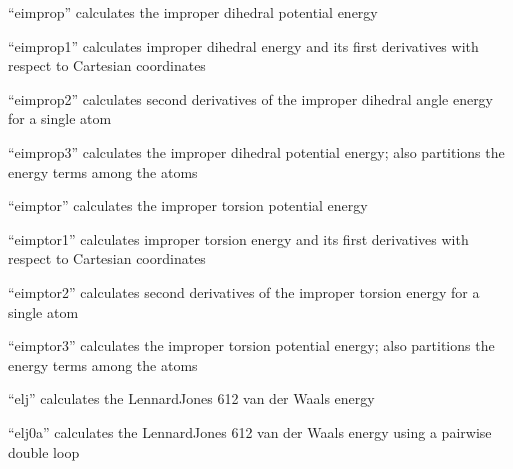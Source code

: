 \documentclass[letterpaper,11pt,english]{sphinxmanual}
\begin{document}






“eimprop” calculates the improper dihedral potential energy


“eimprop1” calculates improper dihedral energy and its first derivatives with respect to Cartesian coordinates


“eimprop2” calculates second derivatives of the improper dihedral angle energy for a single atom


“eimprop3” calculates the improper dihedral potential energy; also partitions the energy terms among the atoms


“eimptor” calculates the improper torsion potential energy


“eimptor1” calculates improper torsion energy and its first derivatives with respect to Cartesian coordinates


“eimptor2” calculates second derivatives of the improper torsion energy for a single atom


“eimptor3” calculates the improper torsion potential energy; also partitions the energy terms among the atoms


“elj” calculates the Lennard\sphinxhyphen{}Jones 6\sphinxhyphen{}12 van der Waals energy


“elj0a” calculates the Lennard\sphinxhyphen{}Jones 6\sphinxhyphen{}12 van der Waals energy using a pairwise double loop

\end{document}
